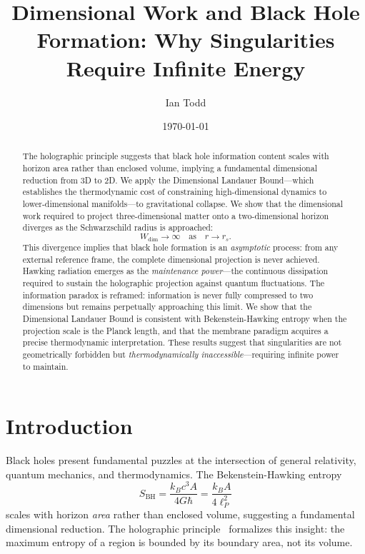 \documentclass[aps,prd,twocolumn,superscriptaddress,floatfix]{revtex4-2}
\begin{document}
\title{Dimensional Work and Black Hole Formation: Why Singularities Require Infinite Energy}

\author{Ian Todd}

\date{\today}

\begin{abstract}
The holographic principle suggests that black hole information content scales with horizon area rather than enclosed volume, implying a fundamental dimensional reduction from 3D to 2D. We apply the Dimensional Landauer Bound---which establishes the thermodynamic cost of constraining high-dimensional dynamics to lower-dimensional manifolds---to gravitational collapse. We show that the dimensional work required to project three-dimensional matter onto a two-dimensional horizon diverges as the Schwarzschild radius is approached:
\[
W_{\mathrm{dim}} \to \infty \quad \text{as} \quad r \to r_s.
\]
This divergence implies that black hole formation is an \emph{asymptotic} process: from any external reference frame, the complete dimensional projection is never achieved. Hawking radiation emerges as the \emph{maintenance power}---the continuous dissipation required to sustain the holographic projection against quantum fluctuations. The information paradox is reframed: information is never fully compressed to two dimensions but remains perpetually approaching this limit. We show that the Dimensional Landauer Bound is consistent with Bekenstein-Hawking entropy when the projection scale is the Planck length, and that the membrane paradigm acquires a precise thermodynamic interpretation. These results suggest that singularities are not geometrically forbidden but \emph{thermodynamically inaccessible}---requiring infinite power to maintain.
\end{abstract}

\maketitle

\section{Introduction}

Black holes present fundamental puzzles at the intersection of general relativity, quantum mechanics, and thermodynamics. The Bekenstein-Hawking entropy~\cite{bekenstein1973,hawking1975}
\begin{equation}
S_{\mathrm{BH}} = \frac{k_B c^3 A}{4 G \hbar} = \frac{k_B A}{4 \ell_P^2}
\end{equation}
scales with horizon \emph{area} rather than enclosed volume, suggesting a fundamental dimensional reduction. The holographic principle~\cite{susskind1995,thooft1993} formalizes this insight: the maximum entropy of a region is bounded by its boundary area, not its volume.
\end{document}
